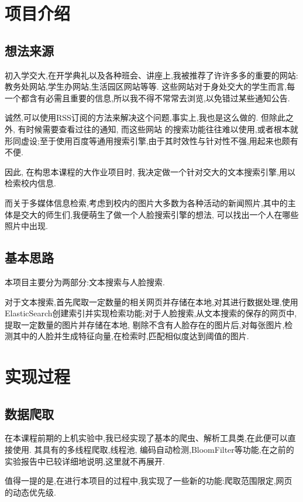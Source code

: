 \documentclass[a4paper]{article}
\begin{document}
    \begingroup
    \hypersetup{linkcolor=black}
    \tableofcontents
    \endgroup
    \newpage
    \section{项目介绍}
        \subsection{想法来源}
初入学交大,在开学典礼以及各种班会、讲座上,我被推荐了许许多多的重要的网站:教务处网站,学生办网站,生活园区网站等等.
这些网站对于身处交大的学生而言,每一个都含有必需且重要的信息,所以我不得不常常去浏览,以免错过某些通知公告.

诚然,可以使用RSS订阅的方法来解决这个问题,事实上,我也是这么做的. 但除此之外, 有时候需要查看过往的通知, 而这些网站
的搜索功能往往难以使用,或者根本就形同虚设;至于使用百度等通用搜索引擎,由于其时效性与针对性不强,用起来也颇有不便.

因此, 在构思本课程的大作业项目时, 我决定做一个针对交大的文本搜索引擎,用以检索校内信息. 

而关于多媒体信息检索,考虑到校内的图片大多数为各种活动的新闻照片,其中的主体是交大的师生们,我便萌生了做一个人脸搜索引擎的想法,
可以找出一个人在哪些照片中出现.
        \subsection{基本思路}
本项目主要分为两部分:文本搜索与人脸搜索.

对于文本搜索,首先爬取一定数量的相关网页并存储在本地,对其进行数据处理,使用
ElasticSearch创建索引并实现检索功能;对于人脸搜索,从文本搜索的保存的网页中,提取一定数量的图片并存储在本地,
剔除不含有人脸存在的图片后,对每张图片,检测其中的人脸并生成特征向量,在检索时,匹配相似度达到阈值的图片.

    \newpage
    \section{实现过程}
        \subsection{数据爬取}
在本课程前期的上机实验中,我已经实现了基本的爬虫、解析工具类,在此便可以直接使用. 其具有的多线程爬取,线程池,
编码自动检测,BloomFilter等功能,在之前的实验报告中已较详细地说明,这里就不再展开.

值得一提的是,在进行本项目的过程中,我实现了一些新的功能:爬取范围限定,网页的动态优先级.
\end{document}

